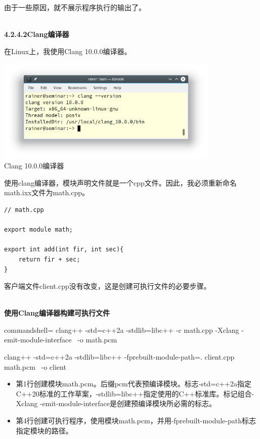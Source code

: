 由于一些原因，就不展示程序执行的输出了。

\hspace*{\fill} \\ %
\noindent
\textbf{4.2.4.2\hspace{0.2cm}Clang编译器}

在Linux上，我使用Clang 10.0.0编译器。

\begin{center}
\includegraphics[width=0.8\textwidth]{content/3/chapter4/images/19.png}\\
Clang 10.0.0编译器
\end{center}

使用clang编译器，模块声明文件就是一个cpp文件。因此，我必须重新命名math.ixx文件为math.cpp。

\begin{lstlisting}[style=styleCXX]
// math.cpp

export module math;

export int add(int fir, int sec){
	return fir + sec;
}
\end{lstlisting}

客户端文件client.cpp没有改变，这是创建可执行文件的必要步骤。

\hspace*{\fill} \\ %
\noindent
\textbf{使用Clang编译器构建可执行文件}
\begin{tcblisting}{commandshell={}}
clang++ -std=c++2a -stdlib=libc++ -c math.cpp -Xclang -emit-module-interface \
   -o math.pcm

clang++ -std=c++2a -stdlib=libc++ -fprebuilt-module-path=. client.cpp math.pcm \
   -o client
\end{tcblisting}

\begin{itemize}
\item 
第1行创建模块math.pcm。后缀pcm代表预编译模块。标志-std=c++2a指定C++20标准的工作草案，-stdlib=libc++指定使用的C++标准库。标记组合-Xclang -emit-module-interface是创建预编译模块所必需的标志。

\item 
第4行创建可执行程序，使用模块math.pcm，并用-fprebuilt-module-path标志指定模块的路径。
\end{itemize}

